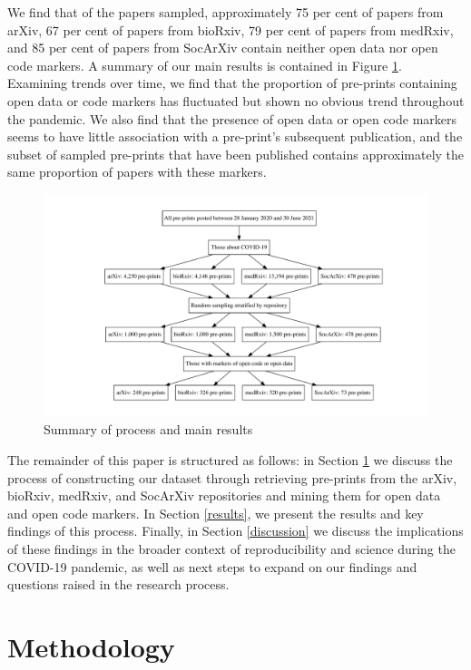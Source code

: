 \documentclass[
]{article}
\begin{document}
We find that of the papers sampled, approximately 75 per cent of papers from arXiv, 67 per cent of papers from bioRxiv, 79 per cent of papers from medRxiv, and 85 per cent of papers from SocArXiv contain neither open data nor open code markers. A summary of our main results is contained in Figure \ref{fig:flowchart}. Examining trends over time, we find that the proportion of pre-prints containing open data or code markers has fluctuated but shown no obvious trend throughout the pandemic. We also find that the presence of open data or open code markers seems to have little association with a pre-print's subsequent publication, and the subset of sampled pre-prints that have been published contains approximately the same proportion of papers with these markers.

\begin{figure}

{\centering \includegraphics[width=0.9\linewidth]{paper_files/figure-latex/flowchart-1} 

}

\caption{Summary of process and main results}\label{fig:flowchart}
\end{figure}

The remainder of this paper is structured as follows: in Section \ref{methodology} we discuss the process of constructing our dataset through retrieving pre-prints from the arXiv, bioRxiv, medRxiv, and SocArXiv repositories and mining them for open data and open code markers. In Section \ref{results}, we present the results and key findings of this process. Finally, in Section \ref{discussion} we discuss the implications of these findings in the broader context of reproducibility and science during the COVID-19 pandemic, as well as next steps to expand on our findings and questions raised in the research process.

\hypertarget{methodology}{%
\section{Methodology}\label{methodology}}
\end{document}
